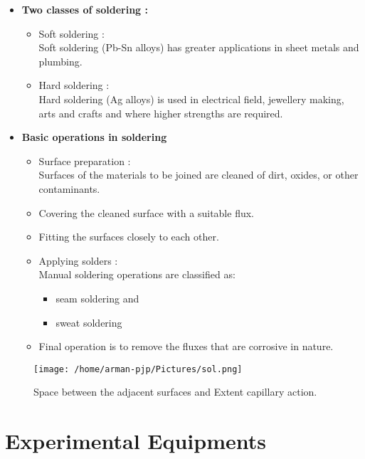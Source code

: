 \documentclass[a4,12pt]{article}
\begin{document}
\begin{itemize}
	\item \textbf {Two classes of soldering :}\\
	\begin{itemize}
		\item Soft soldering :\\
		Soft soldering (Pb-Sn alloys) has greater applications in sheet metals and plumbing.
		
		\item Hard soldering :\\
		Hard soldering (Ag alloys) is used in electrical field,
		jewellery making, arts and crafts and where higher
		strengths are required.
	\end{itemize}
\item \textbf {Basic operations in soldering} 
\begin{itemize}
	\item Surface preparation :\\
	Surfaces of the materials to be joined are cleaned of dirt,
	oxides, or other contaminants.
	
	\item Covering the cleaned surface with a suitable flux.
	
	\item Fitting the surfaces closely to each other.
	
	\item  Applying solders :\\
	Manual soldering operations are
	classified as:
	\begin{itemize}
		\item seam soldering and
		\item sweat soldering
	\end{itemize}
\item Final operation is to remove
the fluxes that are corrosive
in nature.
	
\end{itemize}

	\end{itemize}
\begin{figure}[h!]
	\centering
	\texttt{[image: /home/arman-pjp/Pictures/sol.png]}
	\caption{Space between the adjacent surfaces and Extent capillary action.}
\end{figure}

\section*{Experimental Equipments}\\
\end{document}

